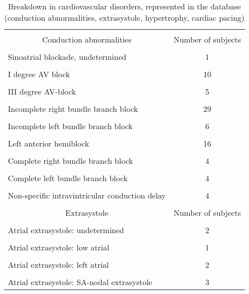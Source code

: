 \documentclass[submitted]{ieeeaccess}
\begin{document}
\begin{table}
\centering
		\caption{Breakdown in cardiovascular disorders, represented in the database (conduction abnormalities, extrasystole, hypertrophy, cardiac pacing)}
		\medskip
        \begin{adjustbox}{width=1\linewidth}
    		\begin{tabular}{|l|c|}
			\hline
			&\\[-1em]
			\multicolumn{1}{c|}{Conduction abnormalities} & {Number of subjects} \\
			\hline
			&\\[-1em]
			Sinoatrial blockade, undetermined & 1 \\
			\hline
			&\\[-1em]
			I degree AV block & 10 \\
			\hline
			&\\[-1em]
			III degree AV-block & 5 \\
			\hline
			&\\[-1em]
			Incomplete right bundle branch block  & 29 \\
			\hline
			&\\[-1em]
			Incomplete left bundle branch block & 6 \\
			\hline
			&\\[-1em]
			Left anterior hemiblock & 16 \\
			\hline
			&\\[-1em]
			Complete right bundle branch block & 4\\
			\hline
			&\\[-1em]
			Complete left bundle branch block & 4 \\
			\hline
			&\\[-1em]
			Non-specific intravintricular conduction delay & 4 \\
			\hline
			&\\[-1em]
			\multicolumn{1}{c|}{Extrasystole} &{Number of subjects} \\
			\hline
			&\\[-1em]
			Atrial extrasystole: undetermined & 2 \\
			\hline
			&\\[-1em]
			Atrial extrasystole: low atrial & 1 \\
			\hline
			&\\[-1em]
			Atrial extrasystole: left atrial & 2 \\
			\hline
			&\\[-1em]
			Atrial extrasystole: SA-nodal extrasystole & 3 \\

\end{tabular}
\end{adjustbox}
\end{table}
\end{document}
